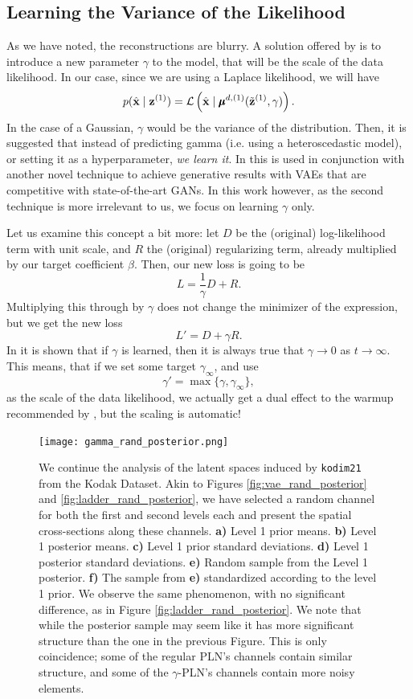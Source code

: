 \subsection{Learning the Variance of the Likelihood}
\label{sec:learn_gamma}
\par
As we have noted, the reconstructions are blurry.
A solution offered by \cite{dai2019diagnosing} is to introduce a new parameter
$\gamma$ to the model, that will be the scale of the data likelihood. In our
case, since we are using a Laplace likelihood, we will have
\[
  p(\hat{\mathbf{x}} \mid \mathbf{z}^{(1)}) = \mathcal{L}\left( \hat{\mathbf{x}} \mid \pmb{\mu}^{d,
      (1)}(\tilde{\mathbf{z}}^{(1)}, \gamma) \right).
\]
In the case of a Gaussian, $\gamma$ would be the variance of the distribution.
Then, it is suggested that instead of predicting gamma (i.e. using a
heteroscedastic model), or setting it as a hyperparameter, \textit{we learn it}.
In \cite{dai2019diagnosing} this is used in conjunction with another novel
technique to achieve generative results with VAEs that are competitive with
state-of-the-art GANs. In this work however, as the second technique is more
irrelevant to us, we focus on learning $\gamma$ only.
\par
Let us examine this concept a bit more: let $D$ be the (original) log-likelihood
term with unit scale, and $R$ the (original) regularizing term, already
multiplied by our target coefficient $\beta$. Then, our new loss is going to be
\[
  L = \frac{1}{\gamma}D + R.
\]
Multiplying this through by $\gamma$ does not change the minimizer of the
expression, but we get the new loss
\[
  L' = D + \gamma R.
\]
In \cite{dai2019diagnosing} it is shown that if $\gamma$ is learned, then it is
always true that $\gamma \rightarrow 0$ as $t \rightarrow \infty$. This means,
that if we set some target $\gamma_\infty$, and use
\[
  \gamma' = \max\{ \gamma, \gamma_\infty \},
\]
as the scale of the data likelihood, we actually get a dual effect to the warmup
recommended by \cite{sonderby2016train}, but the scaling is automatic!
\begin{figure}
  \centering
  \texttt{[image: gamma\_rand\_posterior.png]}
  \caption{We continue the analysis of the latent spaces induced by
    \texttt{kodim21} from the Kodak Dataset. Akin to Figures
    \ref{fig:vae_rand_posterior} and \ref{fig:ladder_rand_posterior},
    we have selected a random channel for both the
    first and second levels each and present the spatial cross-sections along these
    channels. \textbf{a)} Level 1 prior means. \textbf{b)} Level 1 posterior means.
    \textbf{c)} Level 1 prior standard deviations. \textbf{d)} Level 1 posterior
    standard deviations. \textbf{e)} Random sample from the Level 1 posterior.
    \textbf{f)} The sample from \textbf{e)} standardized according to the level
    1 prior. We observe the same phenomenon, with no significant difference, as
    in Figure \ref{fig:ladder_rand_posterior}. We note that while the posterior
    sample may seem like it has more significant structure than the one in the
    previous Figure. This is only coincidence; some of the regular PLN's
    channels contain similar structure, and some of the $\gamma$-PLN's channels
    contain more noisy elements.
  }
  \label{fig:gamma_rand_posterior}
\end{figure}

